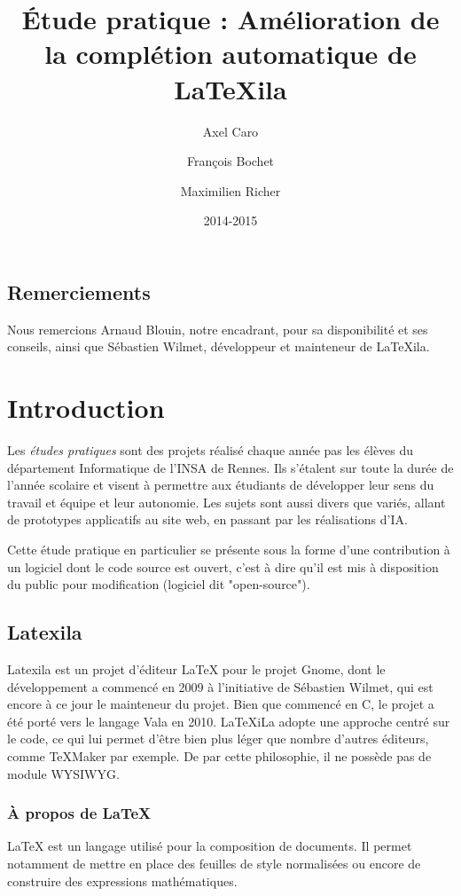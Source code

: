 \documentclass[a4paper,11pt]{report}
\title{Étude pratique : Amélioration de la complétion automatique de \LaTeX{}ila}
\author{Axel Caro\and François Bochet\and Maximilien Richer}
\date{2014-2015}
\begin{document}
\maketitle %
\tableofcontents %

\section{Remerciements} %
\label{sec:remerciements}
Nous remercions Arnaud Blouin, notre encadrant, pour sa disponibilité et ses conseils, ainsi que Sébastien Wilmet, développeur et mainteneur de LaTeXila.

\chapter{Introduction}
\label{cha:Introduction}
Les \textit{études pratiques} sont des projets réalisé chaque année pas les élèves du département Informatique de l'INSA de Rennes. Ils s'étalent sur toute la durée de l'année scolaire et visent à permettre aux étudiants de développer leur sens du travail et équipe et leur autonomie. Les sujets sont aussi divers que variés, allant de prototypes applicatifs au site web, en passant par les réalisations d'IA.

Cette étude pratique en particulier se présente sous la forme d'une contribution à un logiciel dont le code source est ouvert, c'est à dire qu'il est mis à disposition du public pour modification (logiciel dit "open-source").

\section{Latexila}
\label{sec:latexila}
Latexila est un projet d'éditeur LaTeX pour le projet Gnome, dont le développement a commencé en 2009 à l'initiative de Sébastien Wilmet, qui est encore à ce jour le mainteneur du projet. Bien que commencé en C, le projet a été porté vers le langage Vala en 2010. LaTeXiLa adopte une approche centré sur le code, ce qui lui permet d'être bien plus léger que nombre d'autres éditeurs, comme TeXMaker par exemple. De par cette philosophie, il ne possède pas de module WYSIWYG.

\subsection{À propos de \LaTeX{}}
LaTeX est un langage utilisé pour la composition de documents. Il permet notamment de mettre en place des feuilles de style normalisées ou encore de construire des expressions mathématiques.
\end{document}
